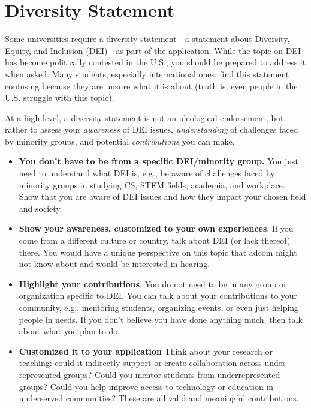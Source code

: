 \documentclass[oneside,11pt]{book}
\begin{document}
\section{Diversity Statement}\label{sec:diversity-statement}

Some universities require a \gls{diversity-statement}---a statement about 
Diversity, Equity, and Inclusion (DEI)---as part of the application.  While the topic on DEI  has become politically contested in the U.S., you should be prepared to address it when asked. Many students, especially international ones, find this statement confusing because they are unsure what it is about (truth is, even people in the U.S. struggle with this topic).


At a high level, a diversity statement is not an ideological endorsement, but rather to assess your \emph{awareness} of DEI issues, \emph{understanding} of challenges faced by minority groups, and potential \emph{contributions} you can make.
\begin{itemize}

\item \textbf{You don't have to be from a specific DEI/minority group.} You just need to understand what DEI is, e.g., be aware of challenges faced by minority groups in studying CS, STEM fields, academia, and workplace. Show that you are aware of DEI issues and how they impact your chosen field and society.


\item \textbf{Show your awareness, customized to your own experiences}. If you come from a different culture or country, talk about DEI (or lack thereof) there.  You would have a unique perspective on this topic that adcom might not know about and would be interested in hearing.


\item \textbf{Highlight your contributions}.  You do not need to be in any group or organization specific to DEI.  You can talk about your contributions to your community, e.g., mentoring students, organizing events, or even just helping people in needs. If you don't believe you have done anything much, then talk about what you plan to do.


\item \textbf{Customized it to your application} 
Think about your research or teaching: could it indirectly support or create collaboration across under-represented groups? Could you mentor students from underrepresented groups? Could you help improve access to technology or education in underserved communities? These are all valid and meaningful contributions.

\end{itemize}
\end{document}
